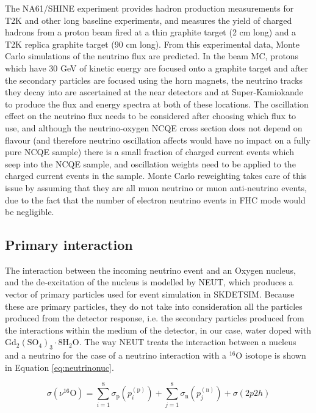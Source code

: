  The NA61/SHINE experiment provides hadron production measurements for T2K and other long baseline experiments, and measures the yield of charged hadrons from a proton beam fired at a thin graphite target (2 cm long) and a T2K replica graphite target (90 cm long). From this experimental data, Monte Carlo simulations of the neutrino flux are predicted. In the beam MC, protons which have 30 GeV of kinetic energy are focused onto a graphite target and after the secondary particles are focused using the horn magnets, the neutrino tracks they decay into are ascertained at the near detectors and at Super-Kamiokande to produce the flux and energy spectra at both of these locations. The oscillation effect on the neutrino flux needs to be considered after choosing which flux to use, and although the neutrino-oxygen NCQE cross section does not depend on flavour (and therefore neutrino oscillation affects would have no impact on a fully pure NCQE sample) there is a small fraction of charged current events which seep into the NCQE sample, and oscillation weights need to be applied to the charged current events in the sample. Monte Carlo reweighting takes care of this issue by assuming that they are all muon neutrino or muon anti-neutrino events, due to the fact that the number of electron neutrino events in FHC mode would be negligible.

\subsection{Primary interaction}

The interaction between the incoming neutrino event and an Oxygen nucleus, and the de-excitation of the nucleus is modelled by NEUT, which produces a vector of primary particles used for event simulation in SKDETSIM. Because these are primary particles, they do not take into consideration all the particles produced from the detector response, i.e. the secondary particles produced from the interactions within the medium of the detector, in our case, water doped with $\mathrm{Gd}_{2}\left(\mathrm{SO}_{4}\right)_{3} \cdot 8 \mathrm{H}_{2} \mathrm{O}$. The way NEUT treats the interaction between a nucleus and a neutrino for the case of a neutrino interaction with a ${ }^{16} \mathrm{O}$ isotope is shown in Equation \ref{eq:neutrinonuc}. 

\begin{equation}
    \sigma\left(\nu^{16} \mathrm{O}\right)=\sum_{i=1}^{8} \sigma_{\mathrm{p}}\left(p_{i}^{(\mathrm{p})}\right)+\sum_{j=1}^{8} \sigma_{\mathrm{n}}\left(p_{j}^{(\mathrm{n})}\right)+\sigma(2 p 2 h)    
\label{eq:neutrinonuc}    
\end{equation}

